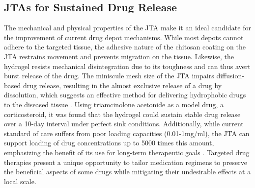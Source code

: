 \subsection{JTAs for Sustained Drug Release}
The mechanical and physical properties of the JTA make it an ideal candidate for the improvement of current drug depot mechanisms. While most depots cannot adhere to the targeted tissue, the adhesive nature of the chitosan coating on the JTA restrains movement and prevents migration on the tissue. Likewise, the hydrogel resists mechanical disintegration due to its toughness and can thus avert burst release of the drug. The miniscule mesh size of the JTA impairs diffusion-based drug release, resulting in the almost exclusive release of a drug by dissolution, which suggests an effective method for delivering hydrophobic drugs to the diseased tissue \autocite{jta_poc}. Using triamcinolone acetonide as a model drug, a corticosteroid, it was found that the hydrogel could sustain stable drug release over a 10-day interval under perfect sink conditions. Additionally, while current standard of care suffers from poor loading capacities (0.01-1mg/ml), the JTA can support loading of drug concentrations up to 5000 times this amount, emphasizing the benefit of its use for long-term therapeutic goals \autocite{jta_poc}. Targeted drug therapies present a unique opportunity to tailor medication regimens to preserve the beneficial aspects of some drugs while mitigating their undesirable effects at a local scale.

